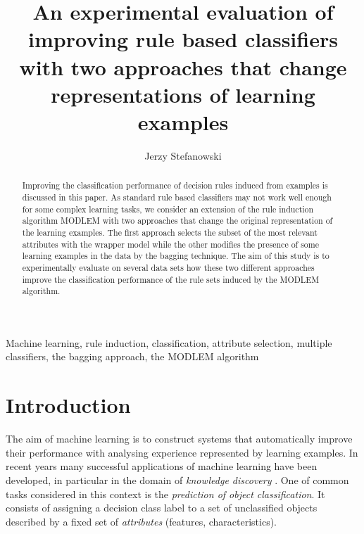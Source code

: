 \documentclass{elsart}
\begin{document}
\begin{frontmatter}

\title{An experimental evaluation of improving rule based
classifiers with two approaches that change representations of learning
examples}


\author{Jerzy Stefanowski}
\address{Institute of Computing Science,
Pozna\'n University of Technology, ul. Piotrowo 3A, 60-965 Pozna\'n,  Poland}

\begin{abstract}
Improving the classification performance of decision rules induced from
examples is discussed in this paper. As standard rule based classifiers may
not work well enough for some complex learning tasks, we consider an
extension of the rule induction algorithm MODLEM with two approaches that
change the original representation of the learning examples. The first
approach selects the subset of the most relevant attributes with the wrapper
model while the other modifies the presence of some learning examples in the
data by the bagging technique. The aim of this study is to experimentally
evaluate on several data sets how these two different approaches improve the
classification performance of the rule sets induced by the  MODLEM
algorithm.
\end{abstract}
\begin{keyword}
Machine learning, rule induction, classification, attribute selection,
multiple classifiers, the bagging approach, the MODLEM algorithm
\end{keyword}
\end{frontmatter}



\section{Introduction}

The aim of machine learning is to construct systems  that automatically
improve their performance with analysing experience represented by learning
examples. In recent years many successful applications of machine learning
have been developed, in particular in the domain of \emph{knowledge
discovery} \cite{MBK98,Zyt02}. One of common tasks considered in this
context is the \emph{prediction of object classification}. It consists of
assigning a decision class label to a set of unclassified objects described
by a fixed set of \emph{attributes} (features, characteristics).
\end{document}
